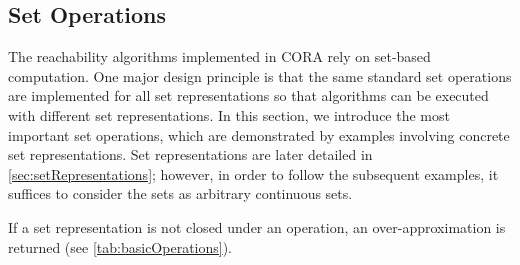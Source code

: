 \subsection{Set Operations} \label{sec:setOperations}

The reachability algorithms implemented in CORA rely on set-based computation. One major design principle is that the same standard set operations are implemented for all set representations so that algorithms can be executed with different set representations. In this section, we introduce the most important set operations, which are demonstrated by examples involving concrete set representations. Set representations are later detailed in \cref{sec:setRepresentations}; however, in order to follow the subsequent examples, it suffices to consider the sets as arbitrary continuous sets.

If a set representation is not closed under an operation, an over-approximation is returned (see \cref{tab:basicOperations}).









